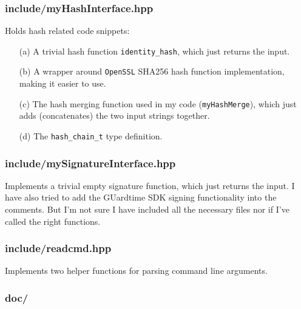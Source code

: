 \documentclass[11pt]{article}
\newcommand{\ct}[1]{\texttt{#1}}
\begin{document}

\subsubsection*{include/myHashInterface.hpp} %
\label{ssub:include_myhashinterface_hpp}

Holds hash related code snippets: 
\begin{itemize}
	\item[(a)] A trivial hash function \ct{identity\_hash}, which just returns the input.
	\item[(b)] A wrapper around \ct{OpenSSL} SHA256 hash function implementation, making it easier to use.
	\item[(c)] The hash merging function used in my code (\ct{myHashMerge}), which just adds (concatenates) the two input strings together.
	\item[(d)] The \ct{hash\_chain\_t} type definition. 
\end{itemize}


\subsubsection*{include/mySignatureInterface.hpp} %
\label{ssub:include_mysignatureinterface_hpp}

Implements a trivial empty signature function, which just returns the input. I have also tried to add the GUardtime SDK signing functionality into the comments. But I'm not sure I have included all the necessary files nor if I've called the right functions. 


\subsubsection*{include/readcmd.hpp} %
\label{ssub:include_readcmd_hpp}

Implements two helper functions for parsing command line arguments.


\subsubsection*{doc/} %
\label{ssub:doc}
\end{document}
